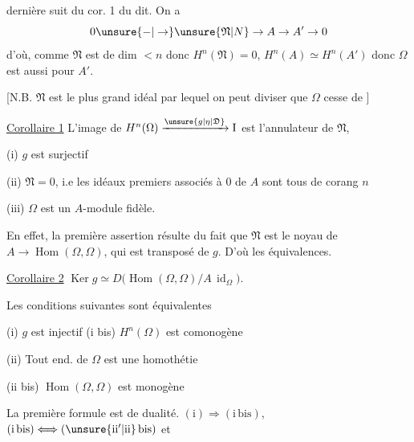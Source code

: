 dernière suit du cor. 1 du dit. On a
\[
0\unsure{-|\to}\unsure{\mathfrak N|N}\to A\to A'\to0
\]
d'où, comme $\mathfrak N$ est de dim $<n$ donc $H^n(\mathfrak N)=0$,
$H^n(A)\simeq H^n(A')$ donc $\Omega$ est aussi  pour $A'$.

[N.B. $\mathfrak N$ est le plus grand idéal par lequel on
peut diviser  que $\Omega$ cesse de  ]

\uline{Corollaire 1} L'image de $H^n(\Omega)\xrightarrow{\unsure{g|\eta|\mathfrak D}}\mathrm I$ est l'annulateur
de $\mathfrak N$,   

(i) $g$ est surjectif

(ii) $\mathfrak N=0$, i.e les idéaux premiers associés à $0$ de $A$
sont tous de  corang $n$

(iii) $\Omega$ est un $A$-module fidèle.

En effet, la première assertion résulte du
fait que $\mathfrak N$ est le noyau de $A\to\operatorname{Hom}(\Omega,\Omega)$,
qui est transposé de $g$. D'où les équivalences.

\uline{Corollaire 2} $\operatorname{Ker}g\simeq D\bigl(\operatorname{Hom}(\Omega,\Omega)/A\,\operatorname{id}_{\Omega}\bigr)$.

Les conditions suivantes sont équivalentes

(i) $g$ est injectif \qquad (i bis) $H^n(\Omega)$ est comonogène

(ii) Tout end. de $\Omega$ est une homothétie

(ii bis) $\operatorname{Hom}(\Omega,\Omega)$ est monogène

La première formule est de dualité.
$(\mathrm i)\Rightarrow(\mathrm{i\,bis})$,  $(\mathrm{i\,bis})\Longleftrightarrow(\unsure{\mathrm{ii}'|\mathrm{ii}}\,\mathrm{bis})$ et

